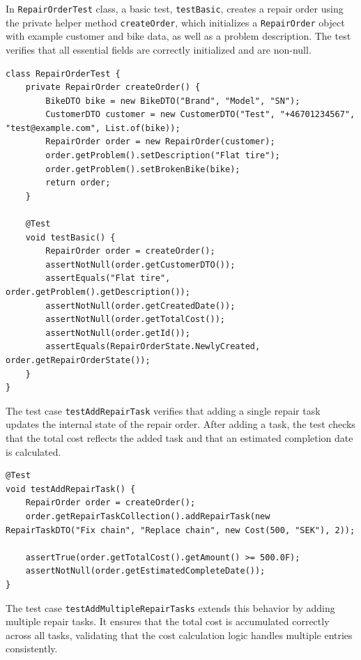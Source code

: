 \documentclass[a4paper]{scrartcl}
\begin{document}
In \texttt{RepairOrderTest} class, a basic test, \texttt{testBasic}, creates a repair order using the private helper method \texttt{createOrder}, which initializes a \texttt{RepairOrder} object with example customer and bike data, as well as a problem description. The test verifies that all essential fields are correctly initialized and are non-null.

\begin{lstlisting}[style=javastyle, caption={Basic initialization and state validation test for \texttt{RepairOrderTest}}]
class RepairOrderTest {
    private RepairOrder createOrder() {
        BikeDTO bike = new BikeDTO("Brand", "Model", "SN");
        CustomerDTO customer = new CustomerDTO("Test", "+46701234567", "test@example.com", List.of(bike));
        RepairOrder order = new RepairOrder(customer);
        order.getProblem().setDescription("Flat tire");
        order.getProblem().setBrokenBike(bike);
        return order;
    }

    @Test
    void testBasic() {
        RepairOrder order = createOrder();
        assertNotNull(order.getCustomerDTO());
        assertEquals("Flat tire", order.getProblem().getDescription());
        assertNotNull(order.getCreatedDate());
        assertNotNull(order.getTotalCost());
        assertNotNull(order.getId());
        assertEquals(RepairOrderState.NewlyCreated, order.getRepairOrderState());
    }
}
\end{lstlisting}

The test case \texttt{testAddRepairTask} verifies that adding a single repair task updates the internal state of the repair order. After adding a task, the test checks that the total cost reflects the added task and that an estimated completion date is calculated.

\begin{lstlisting}[style=javastyle, caption={Test for adding a single repair task to a \texttt{RepairOrderTest}}]
@Test
void testAddRepairTask() {
    RepairOrder order = createOrder();
    order.getRepairTaskCollection().addRepairTask(new RepairTaskDTO("Fix chain", "Replace chain", new Cost(500, "SEK"), 2));

    assertTrue(order.getTotalCost().getAmount() >= 500.0F);
    assertNotNull(order.getEstimatedCompleteDate());
}
\end{lstlisting}

The test case \texttt{testAddMultipleRepairTasks} extends this behavior by adding multiple repair tasks. It ensures that the total cost is accumulated correctly across all tasks, validating that the cost calculation logic handles multiple entries consistently.
\end{document}
